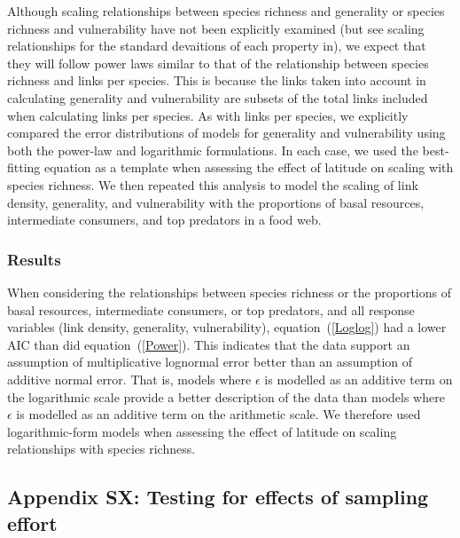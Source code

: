 \documentclass[12pt]{article}
\begin{document}
    Although scaling relationships between species richness and generality or
    species richness and vulnerability have not been explicitly examined (but see scaling 
    relationships for the standard devaitions of each property in\citet{Riede2010}), we expect that they will follow
    power laws similar to that of the relationship between species richness and links per species.
    This is because the links taken into account in calculating generality and vulnerability are subsets 
    of the total links included when calculating links per species. As with links per species, we explicitly 
    compared the error distributions of models for generality and vulnerability using
    both the power-law and logarithmic formulations. 
    In each case, we used the best-fitting equation as a template when assessing the effect of latitude on scaling with
    species richness. We then repeated this analysis 
    to model the scaling of link density, generality, 
    and vulnerability with the proportions of basal 
    resources, intermediate consumers, and top predators
    in a food web.


  \subsubsection*{Results}

    When considering the relationships between species richness or the proportions 
    of basal resources, intermediate consumers, or top predators, and all response variables 
    (link density, generality, vulnerability), equation~(\ref{Loglog}) had a
    lower AIC than did equation~(\ref{Power}). This indicates that the
    data support an assumption of multiplicative lognormal error better than an
    assumption of additive normal error. That is, models where $\epsilon$ is
    modelled as an additive term on
    the logarithmic scale provide a better description of the data than models
    where $\epsilon$ is modelled as an additive term on the arithmetic scale.  
    We therefore used logarithmic-form models when assessing the
    effect of latitude on scaling relationships  with species richness.


\subsection*{Appendix SX: Testing for effects of sampling effort}
\end{document}
